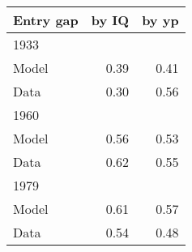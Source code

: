 \begin{tabular}{lrr}
\hline
Entry gap & by IQ  & by yp  \\ 
\hline
1933 &   &   \\ 
Model & 0.39  & 0.41  \\ 
Data & 0.30  & 0.56  \\ 
1960 &   &   \\ 
Model & 0.56  & 0.53  \\ 
Data & 0.62  & 0.55  \\ 
1979 &   &   \\ 
Model & 0.61  & 0.57  \\ 
Data & 0.54  & 0.48  \\ 
\hline
\end{tabular}%
